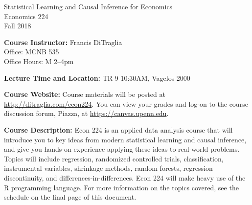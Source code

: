 \documentclass[11pt, letterpaper]{article}
\begin{document}
\thispagestyle{plain}

\begin{center}
\Large
\sc
Statistical Learning and Causal Inference for Economics\\
\large
Economics 224\\
\large
Fall 2018
\end{center}



\normalsize

\noindent \textbf{Course Instructor:} Francis DiTraglia \\
Office: MCNB 535\\
Office Hours: M 2--4pm 

\medskip


%
%
%
% 
\noindent \textbf{Lecture Time and Location:} TR 9-10:30AM, Vagelos 2000 



\medskip
 
\noindent \textbf{Course Website:} Course materials will be posted at \url{http://ditraglia.com/econ224}.
You can view your grades and log-on to the course discussion forum, Piazza, at \url{https://canvas.upenn.edu}.

\medskip



\noindent \textbf{Course Description:} Econ 224 is an applied data analysis course that will introduce you to key ideas from modern statistical learning and causal inference, and give you hands-on experience applying these ideas to real-world problems. 
Topics will include regression, randomized controlled trials, classification, instrumental variables, shrinkage methods, random forests, regression discontinuity, and differences-in-differences.
Econ 224 will make heavy use of the R programming language.
For more information on the topics covered, see the schedule on the final page of this document.

\medskip
\end{document}

